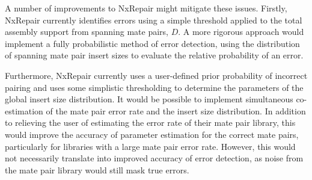 A number of improvements to NxRepair might mitigate these issues. Firstly, NxRepair currently identifies errors using a simple threshold applied to the total assembly support from spanning mate pairs, $D$. A more rigorous approach would implement a fully probabilistic method of error detection, using the distribution of spanning mate pair insert sizes to evaluate the relative probability of an error. 

Furthermore, NxRepair currently uses a user-defined prior probability of incorrect pairing and uses some simplistic thresholding to determine the parameters of the global insert size distribution. It would be possible to implement simultaneous co-estimation of the mate pair error rate and the insert size distribution. In addition to relieving the user of estimating the error rate of their mate pair library, this would improve the accuracy of parameter estimation for the correct mate pairs, particularly for libraries with a large mate pair error rate. However, this would not necessarily translate into improved accuracy of error detection, as noise from the mate pair library would still mask true errors.        

\begin{table}[]
\begin{center}
\caption{Number of large misassemblies and NGA50 as reported by QUAST before (left) and after correction by NxRepair (middle) and A5qc (right) for the second replicate of each of the nine genomes analysed using NxRepair. \label{tab:improvement}}
\end{center}
\end{table}  


